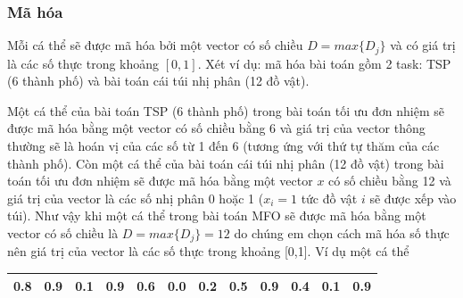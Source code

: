 \documentclass[a4paper,12pt]{report}
\begin{document}
\subsubsection{Mã hóa}
Mỗi cá thể sẽ được mã hóa bởi một vector có số chiều $D = max\{D_j\}$ và có giá trị là các số thực trong khoảng $[0,1]$. Xét ví dụ: mã hóa bài toán gồm 2 task: TSP (6 thành phố) và bài toán cái túi nhị phân (12 đồ vật).
\par Một cá thể của bài toán TSP (6 thành phố) trong bài toán tối ưu đơn nhiệm sẽ được mã hóa bằng một vector có số chiều bằng 6 và giá trị của vector thông thường sẽ là hoán vị của các số từ 1 đến 6 (tương ứng với thứ tự thăm của các thành phố). Còn một cá thể của bài toán cái túi nhị phân (12 đồ vật) trong bài toán tối ưu đơn nhiệm sẽ được mã hóa bằng một vector $x$ có số chiều bằng 12 và giá trị của vector là các số nhị phân 0 hoặc 1 ($x_i=1$ tức đồ vật $i$ sẽ được xếp vào túi). Như vậy khi một cá thể trong bài toán MFO sẽ được mã hóa bằng một vector có số chiều là $D = max\{D_j\} = 12$ do chúng em chọn cách mã hóa số thực nên giá trị của vector là các số thực trong khoảng [0,1]. Ví dụ một cá thể \cite{MFO-slide}
\begin{longtable}{|c|c|c|c|c|c|c|c|c|c|c|c|}
\hline
0.8 & 0.9 & 0.1 & 0.9 & 0.6 & 0.0 & 0.2 & 0.5 & 0.9 & 0.4 & 0.1 & 0.9\\
\hline
\end{longtable}
\end{document}
